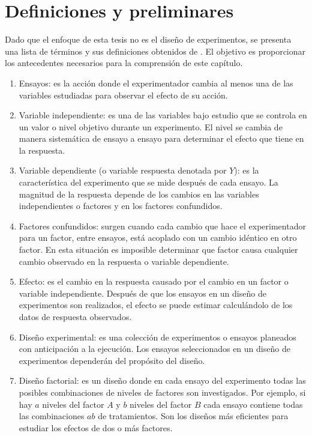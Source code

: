 \section{Definiciones y preliminares}

Dado que el enfoque de esta tesis no es el diseño de experimentos, se presenta una lista de términos y sus definiciones obtenidos de \cite{lawson2015design}. El objetivo es proporcionar los antecedentes necesarios para la comprensión de este capítulo. 

\begin{enumerate}
	\item Ensayos: es la acción donde el experimentador cambia al menos una de las variables estudiadas para observar el efecto de su acción. 
	
	\item Variable independiente: es una de las variables bajo estudio que se controla en un valor o nivel objetivo durante un experimento. El nivel se cambia de manera sistemática de ensayo a ensayo para determinar el efecto que tiene en la respuesta.
	
	\item Variable dependiente (o variable respuesta denotada por $Y$): es la característica del experimento que se mide después de cada ensayo. La magnitud de la respuesta depende de los cambios en las variables independientes o factores y en los factores confundidos. 
	
	\item Factores confundidos: surgen cuando cada cambio que hace el experimentador para un factor, entre ensayos, está acoplado con un cambio idéntico en otro factor. En esta situación es imposible determinar que factor causa cualquier cambio observado en la respuesta o variable dependiente. 
	
	\item Efecto: es el cambio en la respuesta causado por el cambio en un factor o variable independiente. Después de que los ensayos en un diseño de experimentos son realizados, el efecto se puede estimar calculándolo de los datos de respuesta observados. 
	
	\item Diseño experimental: es una colección de experimentos o ensayos planeados con anticipación a la ejecución. Los ensayos seleccionados en un diseño de experimentos dependerán del propósito del diseño. 
	
	
	\item Diseño factorial: es un diseño donde en cada ensayo del experimento todas las posibles combinaciones de niveles de factores son investigados. Por ejemplo, si hay $a$ niveles del factor $A$ y $b$ niveles del factor $B$ cada ensayo contiene todas las combinaciones $ab$ de tratamientos. Son los diseños más eficientes para estudiar los efectos de dos o más factores. 
	

\end{enumerate}
